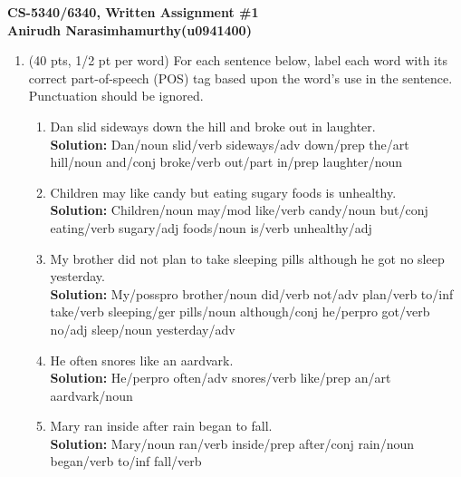 \documentclass[11pt]{article}
\begin{document}
\large
\begin{center}
{\bf CS-5340/6340, Written Assignment \#1} \\
{\bf Anirudh Narasimhamurthy(u0941400)}
\end{center}
\normalsize

\begin{enumerate}  

\item (40 pts, 1/2 pt per word) For each sentence below, label each word with its
  correct part-of-speech (POS) tag based upon the word's use in the sentence.
  Punctuation should be ignored.


\begin{enumerate}

\item Dan slid sideways down the hill and broke out in laughter. \\
\textbf{Solution:} Dan/{\sc noun} slid/{\sc verb} sideways/{\sc adv} down/{\sc prep} the/{\sc art} hill/{\sc noun} and/{\sc conj} broke/{\sc verb} out/{\sc part} in/{\sc prep} laughter/{\sc noun} \\

\item Children may like candy but eating sugary foods is unhealthy. \\
\textbf{Solution:} Children/{\sc noun} may/{\sc mod} like/{\sc verb} candy/{\sc noun} but/{\sc conj} eating/{\sc verb} sugary/{\sc adj} foods/{\sc noun} is/{\sc verb} unhealthy/{\sc adj} \\


\item My brother did not plan to take sleeping pills although he got
  no sleep yesterday.  \\
  \textbf{Solution:} My/{\sc posspro} brother/{\sc noun} did/{\sc verb} not/{\sc adv} plan/{\sc verb} to/{\sc inf} take/{\sc verb} sleeping/{\sc ger} pills/{\sc noun} although/{\sc conj} he/{\sc perpro} got/{\sc verb} no/{\sc adj} sleep/{\sc noun} yesterday/{\sc adv}\\
  

\item He often snores like an aardvark.  \\
\textbf{Solution:} He/{\sc perpro} often/{\sc adv} snores/{\sc verb} like/{\sc prep} an/{\sc art} aardvark/{\sc noun}  \\


\item Mary ran inside after rain began to fall.  \\
\textbf{Solution:} Mary/{\sc noun} ran/{\sc verb} inside/{\sc prep} after/{\sc conj} rain/{\sc noun} began/{\sc verb} to/{\sc inf} fall/{\sc verb}\\



\end{enumerate}
\end{enumerate}
\end{document}
